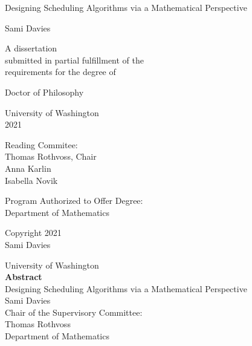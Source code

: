 \documentclass[12pt]{book}
\title{\mytitle}
\author{\myauthor}
\theoremstyle{theorem}
\theoremstyle{remark}
\theoremstyle{definition}
\theoremstyle{plain}
\theoremstyle{plain}
\theoremstyle{plain}
\theoremstyle{definition}
\theoremstyle{theorem}
\def\mytitle{Designing Scheduling Algorithms via a Mathematical Perspective}
\def\myauthor{Sami Davies}
\def\year{2021}
\begin{document}
\pagestyle{empty}

\begin{center}
  {\huge \mytitle}
  \vfill

  {\Large \myauthor}
  \vfill

  \begin{spacing}{1}
    A dissertation \\
    submitted in partial fulfillment of the \\
    requirements for the degree of
  \end{spacing}
  \vfill

  Doctor of Philosophy
  \vfill

  University of Washington \\
  \year
  \vfill

  Reading Commitee: \\
  Thomas Rothvoss, Chair \\
Anna Karlin \\
 Isabella Novik
  \vfill

  \begin{spacing}{1}
    Program Authorized to Offer Degree: \\
    Department of Mathematics
  \end{spacing}
  \clearpage

  \textcopyright{} Copyright \year\\
  \myauthor
  \clearpage
\end{center}

\pagestyle{plain}
\setcounter{page}{1}

\begin{center}
  University of Washington \\[1em]
  \textbf{Abstract}        \\[1em]
  \mytitle                 \\[1em]
  \myauthor                \\[1em]

  Chair of the Supervisory Committee: \\[-0.5em]
  Thomas Rothvoss \\[-0.5em]
  Department of Mathematics
  \\[2em]
\end{center}

\end{document}
